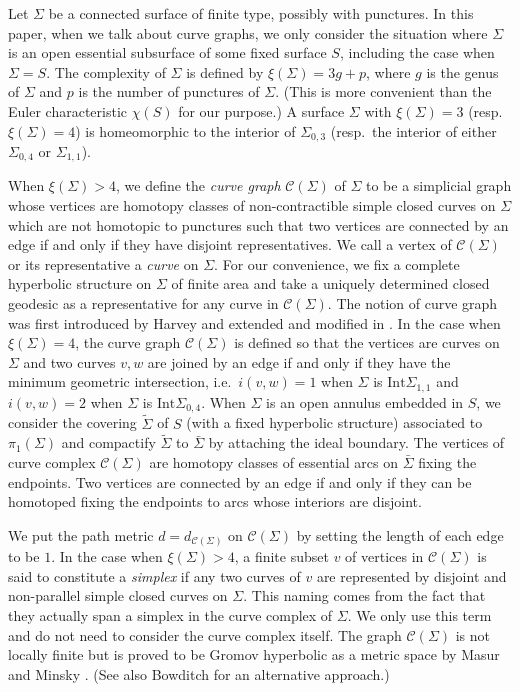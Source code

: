 \documentclass{amsart}
\theoremstyle{definition}
\numberwithin{figure}{section}
\numberwithin{equation}{section}
\newcommand{\blackboard}[1]{\ensuremath{\mathbb{#1}}}
\newcommand{\complexes}{\blackboard{C}}
\newcommand{\ie}{i.e.\ }
\def\cc{\complexes}
\def\cc{\mathcal{C}}
\def\Int{\mathrm{Int}}
\def\Sg{\Sigma}
\def\Sg{\Sigma}
\begin{document}
Let $\Sigma$ be a connected surface of finite type, possibly  with punctures.
In this paper, when we talk about curve graphs, we only consider the situation where $\Sigma$ is an open essential subsurface of some fixed surface $S$, including the case when $\Sigma=S$.
The complexity of $\Sigma$ is defined by $\xi(\Sigma)=3g+p$, where $g$ is the genus 
of $\Sigma$ and $p$ is the number of punctures of $\Sigma$.
(This is more convenient than the Euler characteristic $\chi(S)$ for our purpose.)
A surface $\Sigma$ with $\xi(\Sigma)=3$ (resp.\ $\xi(\Sigma)=4$) is homeomorphic to the interior of $\Sg_{0,3}$ 
(resp.\  the interior of either $\Sg_{0,4}$ or $\Sg_{1,1}$).



When $\xi(\Sigma)>4$, we define the \emph{curve graph} $\cc(\Sigma)$ of $\Sigma$ to be a simplicial graph whose vertices are 
homotopy classes of non-contractible  simple closed curves on $\Sigma$ which are not homotopic to punctures such that two vertices are connected by an edge if and only if they have disjoint representatives.
We call a vertex of $\cc(\Sigma)$ or its representative a \emph{curve} on $\Sigma$.
For our convenience, we fix a complete hyperbolic structure on $\Sigma$ of finite area and take a uniquely determined closed geodesic as a representative for any curve in $\cc(\Sigma)$.
The notion of curve graph was first introduced by Harvey \cite{har} and extended and modified in \cite{mm1,mm2,mi1}.
In the case when $\xi(\Sigma)=4$, the curve graph $\cc(\Sigma)$ is defined so that  
the vertices are 
curves on $\Sigma$ and two curves $v,w$ are joined by an edge if and only if they have the 
minimum geometric intersection, 
\ie $i(v,w)=1$ when $\Sigma$ is $\Int \Sg_{1,1}$ and $i(v,w)=2$ when $\Sigma$ is $\Int \Sg_{0,4}$.
When $\Sigma$ is an open annulus embedded in $S$, we consider the covering $\tilde{\Sigma}$ of $S$ (with a fixed hyperbolic structure) associated to $\pi_1(\Sigma)$ and compactify $\tilde \Sigma$ to $\bar \Sigma$ by attaching the ideal boundary.
The vertices of curve complex $\cc(\Sigma)$ are homotopy classes of essential arcs on $\bar \Sigma$ fixing the endpoints.
Two vertices are connected by an edge if and only if they can be homotoped fixing the endpoints to arcs whose interiors are disjoint.


We put the path metric $d=d_{\cc(\Sigma)}$ on $\cc(\Sigma)$ by setting the length of  each edge to be $1$.
In the case when $\xi(\Sigma) >4$, a finite subset $v$ of vertices in $\cc(\Sigma)$ is said to constitute a \emph{simplex} if any two curves of $v$ are represented by  disjoint and non-parallel simple closed curves on $\Sigma$.
This naming comes from the fact that they actually span a simplex in the curve complex of $\Sigma$.
We only use this term and do not need to consider the curve complex itself.
The graph $\cc(\Sigma)$ is not locally finite but is proved to be Gromov hyperbolic as a metric space by Masur and Minsky 
\cite{mm1}.
 (See also Bowditch \cite{bow1} for an alternative approach.)
\end{document}
